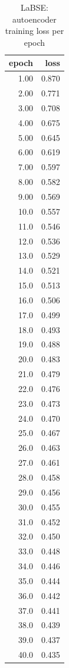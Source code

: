 \begin{table}[ht]
\centering
\caption{LaBSE: autoencoder training loss per epoch}
\label{tab:labse_ae_training_losses}
\begin{tabular}{rr}
\toprule
epoch & loss \\
\midrule
1.00 & 0.870 \\
2.00 & 0.771 \\
3.00 & 0.708 \\
4.00 & 0.675 \\
5.00 & 0.645 \\
6.00 & 0.619 \\
7.00 & 0.597 \\
8.00 & 0.582 \\
9.00 & 0.569 \\
10.0 & 0.557 \\
11.0 & 0.546 \\
12.0 & 0.536 \\
13.0 & 0.529 \\
14.0 & 0.521 \\
15.0 & 0.513 \\
16.0 & 0.506 \\
17.0 & 0.499 \\
18.0 & 0.493 \\
19.0 & 0.488 \\
20.0 & 0.483 \\
21.0 & 0.479 \\
22.0 & 0.476 \\
23.0 & 0.473 \\
24.0 & 0.470 \\
25.0 & 0.467 \\
26.0 & 0.463 \\
27.0 & 0.461 \\
28.0 & 0.458 \\
29.0 & 0.456 \\
30.0 & 0.455 \\
31.0 & 0.452 \\
32.0 & 0.450 \\
33.0 & 0.448 \\
34.0 & 0.446 \\
35.0 & 0.444 \\
36.0 & 0.442 \\
37.0 & 0.441 \\
38.0 & 0.439 \\
39.0 & 0.437 \\
40.0 & 0.435 \\
\bottomrule
\end{tabular}
\end{table}
